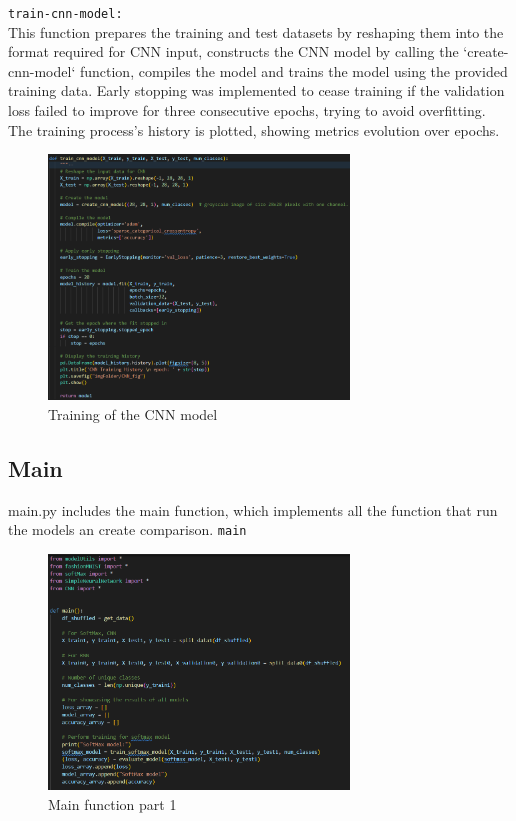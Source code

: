 \documentclass{article}
\newcommand{\code}[1]{\colorbox{light-gray}{\texttt{#1}}}
\begin{document}
\code{train-cnn-model:}\\\newline
This function prepares the training and test datasets by reshaping them into the format
required for CNN input, constructs the CNN model by calling the `create-cnn-model` function,
compiles the model and trains the model using the provided training data.
Early stopping was implemented to cease training if the validation loss failed to improve for three consecutive epochs,
trying to avoid overfitting.
The training process's history is plotted, showing metrics evolution over epochs.
\begin{figure}[H]
    \caption{Training of the CNN model}
    \centering
    \includegraphics[width=8cm]{../imgFolder/train_cnn_model.png}
\end{figure}

\subsection{Main}
main.py includes the main function, which implements all the function that run the models an create comparison.
\code{main}
\begin{figure}[H]
    \caption{Main function part 1}
    \centering
    \includegraphics[width=8cm]{../imgFolder/mainPart1.png}
\end{figure}
\end{document}
